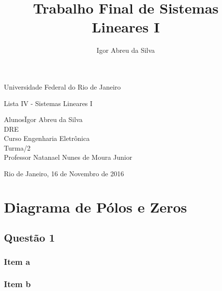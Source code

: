 \documentclass[a4paper, 12pt]{article}
\author{Igor Abreu da Silva}
\title{Trabalho Final de Sistemas Lineares I}
\begin{document}
    \begin{titlepage}
        \begin{center}
            \huge{Universidade Federal do Rio de Janeiro}
            \vspace{95pt}

            \large{Lista IV - Sistemas Lineares I}
            \vspace{160pt}
        \end{center}

        \begin{flushleft}
            \begin{tabbing}
                Alunos\qquad\qquad\= Igor Abreu da Silva\\
                DRE \\
                Curso\> Engenharia Eletrônica \\
                Turma/2 \\
                Professor\> Natanael Nunes de Moura Junior \\

            \end{tabbing}

        \end{flushleft}

        \begin{center}
            \vspace{\fill}
            Rio de Janeiro, 16 de Novembro de 2016
        \end{center}
    \end{titlepage}

    \newpage
    \tableofcontents
    \listoffigures
    \thispagestyle{empty}
    \newpage

\section{Diagrama de P\'{o}los e Zeros}
    \subsection{Quest\~{a}o 1}
        \subsubsection{Item a}
        \subsubsection{Item b}
\end{document}
